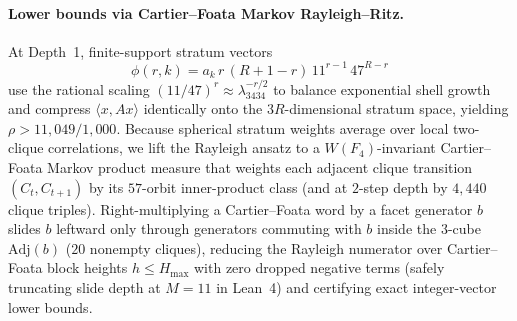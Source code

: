 \paragraph{Lower bounds via Cartier--Foata Markov Rayleigh--Ritz.}
At Depth~1, finite-support stratum vectors
\begin{equation}
\label{eq:rr-ansatz}
\phi(r, k) = a_k\,r\,(R + 1 - r)\,11^{r-1}\,47^{R-r}
\end{equation}
use the rational scaling $(11/47)^r \approx \lambda_{3434}^{-r/2}$ to balance exponential shell growth and compress $\langle x, A x \rangle$ identically onto the $3R$-dimensional stratum space, yielding $\rho > 11{,}049/1{,}000$. Because spherical stratum weights average over local two-clique correlations, we lift the Rayleigh ansatz to a $W(F_4)$-invariant Cartier--Foata Markov product measure that weights each adjacent clique transition $(C_t, C_{t+1})$ by its $57$-orbit inner-product class (and at $2$-step depth by $4{,}440$ clique triples). Right-multiplying a Cartier--Foata word by a facet generator $b$ slides $b$ leftward only through generators commuting with $b$ inside the $3$-cube $\mathrm{Adj}(b)$ ($20$ nonempty cliques), reducing the Rayleigh numerator over Cartier--Foata block heights $h \le H_{\max}$ with zero dropped negative terms (safely truncating slide depth at $M = 11$ in Lean~4) and certifying exact integer-vector lower bounds.

